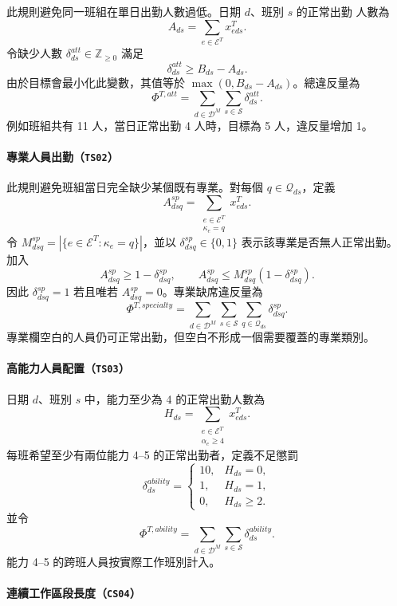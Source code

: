 \documentclass[12pt]{article}
\begin{document}
此規則避免同一班組在單日出勤人數過低。日期 \(d\)、班別 \(s\) 的正常出勤
人數為
\[
  A_{ds}=\sum_{e\in\mathcal{E}^{T}}x^{T}_{eds}.
\]
令缺少人數 \(\delta^{att}_{ds}\in\mathbb{Z}_{\geq0}\) 滿足
\[
  \delta^{att}_{ds}\geq B_{ds}-A_{ds}.
\]
由於目標會最小化此變數，其值等於
\(\max(0,B_{ds}-A_{ds})\)。總違反量為
\[
  \Phi^{T,att}
  =
  \sum_{d\in\mathcal{D}^{M}}
  \sum_{s\in\mathcal{S}}\delta^{att}_{ds}.
\]
例如班組共有 11 人，當日正常出勤 4 人時，目標為 5 人，違反量增加 1。

\paragraph{專業人員出勤（\texttt{TS02}）}

此規則避免班組當日完全缺少某個既有專業。對每個
\(q\in\mathcal{Q}_{ds}\)，定義
\[
  A^{sp}_{dsq}
  =
  \sum_{\substack{e\in\mathcal{E}^{T}\\\kappa_e=q}}x^{T}_{eds}.
\]
令 \(M^{sp}_{dsq}=|\{e\in\mathcal{E}^{T}:\kappa_e=q\}|\)，並以
\(\delta^{sp}_{dsq}\in\{0,1\}\) 表示該專業是否無人正常出勤。加入
\[
  A^{sp}_{dsq}\geq1-\delta^{sp}_{dsq},
  \qquad
  A^{sp}_{dsq}\leq M^{sp}_{dsq}(1-\delta^{sp}_{dsq}).
\]
因此 \(\delta^{sp}_{dsq}=1\) 若且唯若 \(A^{sp}_{dsq}=0\)。專業缺席違反量為
\[
  \Phi^{T,specialty}
  =
  \sum_{d\in\mathcal{D}^{M}}
  \sum_{s\in\mathcal{S}}
  \sum_{q\in\mathcal{Q}_{ds}}\delta^{sp}_{dsq}.
\]
專業欄空白的人員仍可正常出勤，但空白不形成一個需要覆蓋的專業類別。

\paragraph{高能力人員配置（\texttt{TS03}）}

日期 \(d\)、班別 \(s\) 中，能力至少為 4 的正常出勤人數為
\[
  H_{ds}
  =
  \sum_{\substack{e\in\mathcal{E}^{T}\\\alpha_e\geq4}}x^{T}_{eds}.
\]
每班希望至少有兩位能力 4--5 的正常出勤者，定義不足懲罰
\[
  \delta^{ability}_{ds}
  =
  \begin{cases}
    10, & H_{ds}=0,\\
    1, & H_{ds}=1,\\
    0, & H_{ds}\geq2.
  \end{cases}
\]
並令
\[
  \Phi^{T,ability}
  =
  \sum_{d\in\mathcal{D}^{M}}
  \sum_{s\in\mathcal{S}}\delta^{ability}_{ds}.
\]
能力 4--5 的跨班人員按實際工作班別計入。

\paragraph{連續工作區段長度（\texttt{CS04}）}
\end{document}
